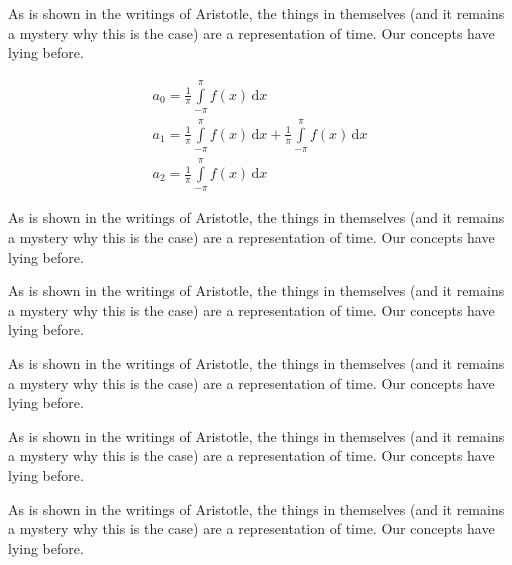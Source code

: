 \documentclass[12pt,chapterrefs]{ndsu-thesis-2022}
\begin{document}
As is shown in the writings of Aristotle, the things in themselves (and it remains a mystery why this is the case) are a representation of time. Our concepts have lying before.

\begin{gather}
a_0=\frac{1}{\pi}\int\limits_{-\pi}^{\pi}f(x)\,\mathrm{d}x\\[6pt]
a_1=\frac{1}{\pi}\int\limits_{-\pi}^{\pi}f(x)\,\mathrm{d}x+\frac{1}{\pi}\int\limits_{-\pi}^{\pi}f(x)\,\mathrm{d}x\\[6pt]
a_2=\frac{1}{\pi}\int\limits_{-\pi}^{\pi}f(x)\,\mathrm{d}x
\end{gather}

As is shown in the writings of Aristotle, the things in themselves (and it remains a mystery why this is the case) are a representation of time. Our concepts have lying before.

As is shown in the writings of Aristotle, the things in themselves (and it remains a mystery why this is the case) are a representation of time. Our concepts have lying before.


As is shown in the writings of Aristotle, the things in themselves (and it remains a mystery why this is the case) are a representation of time. Our concepts have lying before.

\vspace{2ex}
\vspace{2ex}

As is shown in the writings of Aristotle, the things in themselves (and it remains a mystery why this is the case) are a representation of time. Our concepts have lying before.

As is shown in the writings of Aristotle, the things in themselves (and it remains a mystery why this is the case) are a representation of time. Our concepts have lying before.

\end{document}
